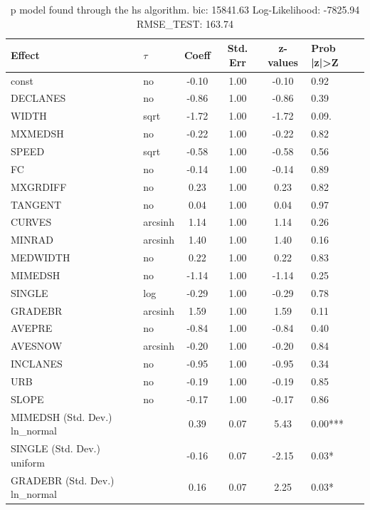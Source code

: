 \begin{table}
	\caption{p model found through the hs algorithm. bic: 15841.63 Log-Likelihood: -7825.94 RMSE_TEST: 163.74}
	\begin{center}
		\begin{tabular}{|l|l|c|c|c|l|}
			\hline
			Effect & $\tau$ & Coeff & Std. Err & z-values & Prob |z|>Z \\
			\hline
			const & no & -0.10 & 1.00 & -0.10 & 0.92 \\
			\hline
			DECLANES & no & -0.86 & 1.00 & -0.86 & 0.39 \\
			\hline
			WIDTH & sqrt & -1.72 & 1.00 & -1.72 & 0.09. \\
			\hline
			MXMEDSH & no & -0.22 & 1.00 & -0.22 & 0.82 \\
			\hline
			SPEED & sqrt & -0.58 & 1.00 & -0.58 & 0.56 \\
			\hline
			FC & no & -0.14 & 1.00 & -0.14 & 0.89 \\
			\hline
			MXGRDIFF & no & 0.23 & 1.00 & 0.23 & 0.82 \\
			\hline
			TANGENT & no & 0.04 & 1.00 & 0.04 & 0.97 \\
			\hline
			CURVES & arcsinh & 1.14 & 1.00 & 1.14 & 0.26 \\
			\hline
			MINRAD & arcsinh & 1.40 & 1.00 & 1.40 & 0.16 \\
			\hline
			MEDWIDTH & no & 0.22 & 1.00 & 0.22 & 0.83 \\
			\hline
			MIMEDSH & no & -1.14 & 1.00 & -1.14 & 0.25 \\
			\hline
			SINGLE & log & -0.29 & 1.00 & -0.29 & 0.78 \\
			\hline
			GRADEBR & arcsinh & 1.59 & 1.00 & 1.59 & 0.11 \\
			\hline
			AVEPRE & no & -0.84 & 1.00 & -0.84 & 0.40 \\
			\hline
			AVESNOW & arcsinh & -0.20 & 1.00 & -0.20 & 0.84 \\
			\hline
			INCLANES & no & -0.95 & 1.00 & -0.95 & 0.34 \\
			\hline
			URB & no & -0.19 & 1.00 & -0.19 & 0.85 \\
			\hline
			SLOPE & no & -0.17 & 1.00 & -0.17 & 0.86 \\
			\hline
			MIMEDSH (Std. Dev.) ln_normal &  & 0.39 & 0.07 & 5.43 & 0.00*** \\
			\hline
			SINGLE (Std. Dev.) uniform &  & -0.16 & 0.07 & -2.15 & 0.03* \\
			\hline
			GRADEBR (Std. Dev.) ln_normal &  & 0.16 & 0.07 & 2.25 & 0.03* \\

\end{tabular}
\end{center}
\end{table}
